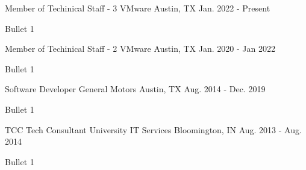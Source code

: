 

\begin{cventries}

  \cventry
    {Member of Techinical Staff - 3} %
    {VMware} %
    {Austin, TX} %
    {Jan. 2022 - Present} %
    {
      \begin{cvitems} %
        \item {Bullet 1}
      \end{cvitems}
    }
\cventry
    {Member of Techinical Staff - 2} %
    {VMware} %
    {Austin, TX} %
    {Jan. 2020 - Jan 2022} %
    {
      \begin{cvitems} %
        \item {Bullet 1}
      \end{cvitems}
    }
  \cventry
    {Software Developer} %
    {General Motors} %
    {Austin, TX} %
    {Aug. 2014 - Dec. 2019} %
    {
      \begin{cvitems} %
        \item {Bullet 1}
      \end{cvitems}
    }

  \cventry
    {TCC Tech Consultant} %
    {University IT Services} %
    {Bloomington, IN} %
    {Aug. 2013 - Aug. 2014} %
    {
      \begin{cvitems} %
        \item {Bullet 1}
      \end{cvitems}
    }

\end{cventries}
